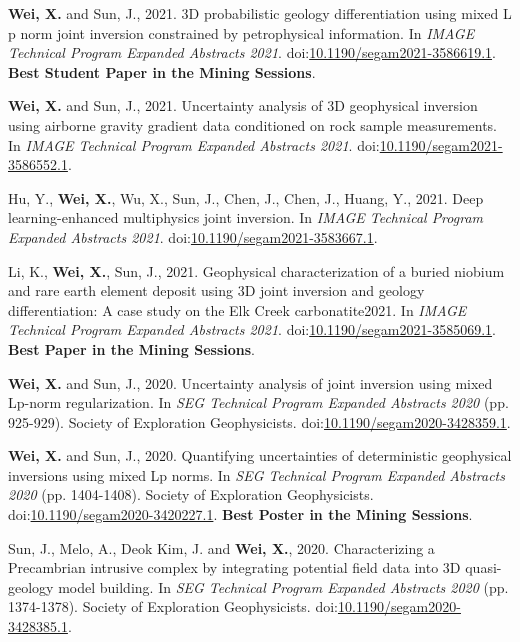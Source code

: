 \documentclass[11pt, a4paper]{article}
\newcommand{\LastName}{Wei}
\newcommand{\Initials}{X}
\newcommand{\Wei}{\textbf{\LastName, \Initials.}}  %
\newcommand{\WeiSun}{\textbf{\LastName, \Initials.} and Sun, J.}  %
\newcommand{\DOI}[1]{doi:\href{https://doi.org/#1}{#1}}
\begin{document}
\begin{etaremune}
	\item
	\WeiSun, 2021. 3D probabilistic geology differentiation using mixed L p norm joint inversion constrained by petrophysical information. In \emph{IMAGE Technical Program Expanded Abstracts 2021}. \DOI{10.1190/segam2021-3586619.1}. \textbf{Best Student Paper in the Mining Sessions}.

	\item
	\WeiSun, 2021. Uncertainty analysis of 3D geophysical inversion using airborne gravity gradient data conditioned on rock sample measurements. In \emph{IMAGE Technical Program Expanded Abstracts 2021}. \DOI{10.1190/segam2021-3586552.1}.

	\item
	Hu, Y., \Wei, Wu, X., Sun, J., Chen, J., Chen, J., Huang, Y., 2021. Deep learning-enhanced multiphysics joint inversion. In \emph{IMAGE Technical Program Expanded Abstracts 2021}. \DOI{10.1190/segam2021-3583667.1}.

	\item
	Li, K., \Wei, Sun, J., 2021. Geophysical characterization of a buried niobium and rare earth element deposit using 3D joint inversion and geology differentiation: A case study on the Elk Creek carbonatite2021. In \emph{IMAGE Technical Program Expanded Abstracts 2021}. \DOI{10.1190/segam2021-3585069.1}. \textbf{Best Paper in the Mining Sessions}.

	\item
	\WeiSun, 2020. Uncertainty analysis of joint inversion using mixed Lp-norm regularization. In \emph{SEG Technical Program Expanded Abstracts 2020} (pp. 925-929). Society of Exploration Geophysicists. \DOI{10.1190/segam2020-3428359.1}.

	\item
	\WeiSun, 2020. Quantifying uncertainties of deterministic geophysical inversions using mixed Lp norms. In \emph{SEG Technical Program Expanded Abstracts 2020} (pp. 1404-1408). Society of Exploration Geophysicists. \DOI{10.1190/segam2020-3420227.1}. \textbf{Best Poster in the Mining Sessions}.

	\item
	Sun, J., Melo, A., Deok Kim, J. and \Wei, 2020. Characterizing a Precambrian intrusive complex by integrating potential field data into 3D quasi-geology model building. In \emph{SEG Technical Program Expanded Abstracts 2020} (pp. 1374-1378). Society of Exploration Geophysicists. \DOI{10.1190/segam2020-3428385.1}.

\end{etaremune}
\end{document}
